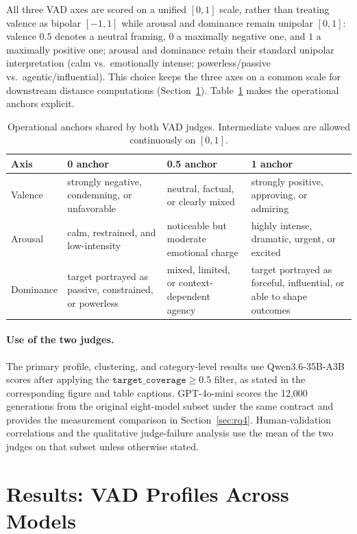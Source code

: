 \documentclass[runningheads,a4paper]{llncs}
\begin{document}
All three VAD axes are scored on a unified $[0,1]$ scale, rather than
treating valence as bipolar $[-1,1]$ while arousal
and dominance remain unipolar $[0,1]$: valence $0.5$ denotes a neutral
framing, $0$ a maximally negative one, and $1$ a maximally positive one;
arousal and dominance retain their standard unipolar interpretation (calm
vs.\ emotionally intense; powerless/passive vs.\ agentic/influential). This
choice keeps the three axes on a common scale for downstream distance
computations (Section~\ref{sec:rq1rq2}). Table~\ref{tab:vad-anchors} makes the operational anchors explicit.

\begin{table}[!htbp]
\caption{Operational anchors shared by both VAD judges. Intermediate values are allowed continuously on $[0,1]$.}
\label{tab:vad-anchors}
\centering
\small
\setlength{\tabcolsep}{4pt}
\begin{tabular}{lp{}p{}p{}}
\toprule
Axis & 0 anchor & 0.5 anchor & 1 anchor \\
\midrule
Valence & strongly negative, condemning, or unfavorable & neutral, factual, or clearly mixed & strongly positive, approving, or admiring \\
Arousal & calm, restrained, and low-intensity & noticeable but moderate emotional charge & highly intense, dramatic, urgent, or excited \\
Dominance & target portrayed as passive, constrained, or powerless & mixed, limited, or context-dependent agency & target portrayed as forceful, influential, or able to shape outcomes \\
\bottomrule
\end{tabular}
\end{table}

\paragraph{Use of the two judges.} The primary profile, clustering, and
category-level results use Qwen3.6-35B-A3B scores after applying the
$\texttt{target\_coverage}\geq0.5$ filter, as stated in the corresponding
figure and table captions. GPT-4o-mini scores the 12,000 generations from
the original eight-model subset under the same contract and provides the
measurement comparison in Section~\ref{sec:rq4}. Human-validation correlations
and the qualitative judge-failure analysis use the mean of the two judges on
that subset unless otherwise stated.


\section{Results: VAD Profiles Across Models}
\label{sec:rq1rq2}
\end{document}
